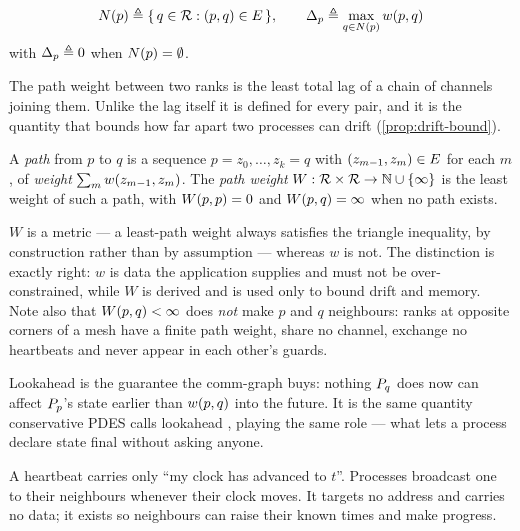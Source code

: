 \begin{definition}[Neighbourhood]\label{def:neighbourhood}
\[
  N(p) \triangleq \{\, q \in \mathcal{R} : (p, q) \in E \,\},
  \qquad
  \Delta_p \triangleq \max_{q \in N(p)} w(p,q)
\]
with $\Delta_p \triangleq 0$ when $N(p) = \emptyset$.
\end{definition}

The path weight between two ranks is the least total lag of a chain of
channels joining them. Unlike the lag itself it is defined for every pair, and
it is the quantity that bounds how far apart two processes can drift
(\cref{prop:drift-bound}).

\begin{definition}\label{def:path-weight}
A \emph{path} from $p$ to $q$ is a sequence $p = z_0, \dots, z_k = q$ with
$(z_{m-1}, z_m) \in E$ for each $m$, of \emph{weight}
$\sum_{m} w(z_{m-1},z_m)$. The \emph{path weight}
$W : \mathcal{R} \times \mathcal{R} \to \mathbb{N} \cup \{\infty\}$ is the least weight of
such a path, with $W(p,p) = 0$ and $W(p,q) = \infty$ when no path
exists.
\end{definition}

\begin{remark}\label{rem:path-weight-metric}
$W$ is a metric --- a least-path weight always satisfies the triangle
inequality, by construction rather than by assumption --- whereas $w$ is not.
The distinction is exactly right: $w$ is data the application supplies and
must not be over-constrained, while $W$ is derived and is used only to bound
drift and memory. Note also that $W(p,q) < \infty$ does \emph{not} make $p$
and $q$ neighbours: ranks at opposite corners of a mesh have a finite path
weight, share no channel, exchange no \glspl{heartbeat} and never appear in
each other's guards.
\end{remark}

Lookahead is the guarantee the \gls{comm-graph} buys: nothing $P_{q}$ does
now can affect $P_{p}$'s state earlier than $w(p,q)$ into the future.
It is the same quantity conservative PDES calls lookahead \cite{chandy1979},
playing the same role --- what lets a process declare state final without
asking anyone.

A heartbeat carries only ``my clock has advanced to $t$''. Processes broadcast
one to their neighbours whenever their clock moves. It targets no address and
carries no data; it exists so neighbours can raise their known times and make
progress.

